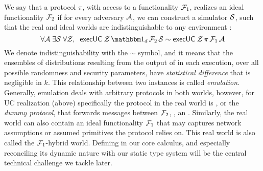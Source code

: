 We say that a protocol $\pi$, with access to a functionality $\mathcal{F}_1$, realizes an ideal functionality $\mathcal{F}_2$
if for every adversary $\mathcal{A}$, we can construct a simulator $\mathcal{S}$, such that the real and ideal worlds are indistinguishable to any environment \Z:
\begin{equation}
  \label{eqn:emulation}
  \forall \A \; \exists \Sim \; \forall \Z, \; \; \msf{execUC} \; \Z \, \idealP \, \F_2 \, \Sim \sim \msf{execUC} \; \Z \, \pi \, \F_1 \, \A
\end{equation}
We denote indistinguishability with the $\sim$ symbol, and it means that the ensembles of distributions resulting from the output of \Z in each execution, over all possible randomness and security parameters, have \emph{statistical difference} that is negligible in $k$. This relationship between two  instances is called \emph{emulation}. 
Generally, emulation deals with arbitrary protocols in both worlds, however, for UC realization (above) specifically the protocol in the real world is \idealP, or the \emph{dummy protocol}, that forwards messages between $\mathcal{F}_2$, \Z,  an \A. 
Similarly, the real world can also contain an ideal functionality $\mathcal{F}_1$ that may captures network assumptions or assumed primitives the protocol relies on. 
This real world is also called the $\mathcal{F}_1$-hybrid world.
Defining  in our core calculus, and especially reconciling its dynamic nature with our static type system will be the central technical challenge we tackle later.

